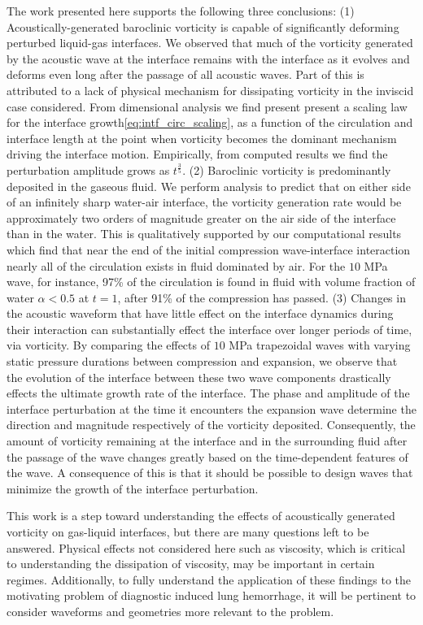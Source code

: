 \documentclass{article}
\begin{document}
The work presented here supports the following three conclusions: (1)
Acoustically-generated baroclinic vorticity is capable of
significantly deforming perturbed liquid-gas interfaces. We observed
that much of the vorticity generated by the acoustic wave at the
interface remains with the interface as it evolves and deforms even
long after the passage of all acoustic waves. Part of this is
attributed to a lack of physical mechanism for dissipating vorticity
in the inviscid case considered. From dimensional analysis we find
present present a scaling law for the interface
growth\eqref{eq:intf_circ_scaling}, as a function of the circulation
and interface length at the point when vorticity becomes the dominant
mechanism driving the interface motion. Empirically, from computed
results we find the perturbation amplitude grows as
$t^{\frac{3}{5}}$. 
%
(2) Baroclinic vorticity is predominantly deposited in the gaseous
fluid. We perform analysis to predict that on either side of an
infinitely sharp water-air interface, the vorticity generation rate
would be approximately two orders of magnitude greater on the air side
of the interface than in the water. This is qualitatively supported by
our computational results which find that near the end of the initial
compression wave-interface interaction nearly all of the circulation
exists in fluid dominated by air. For the $10$ MPa wave, for instance,
97\% of the circulation is found in fluid with volume fraction of
water $\alpha<0.5$ at $t=1$, after 91\% of the compression has passed.
%
(3) Changes in the acoustic waveform that have little effect on the
interface dynamics during their interaction can substantially effect
the interface over longer periods of time, via vorticity. By comparing
the effects of $10$ MPa trapezoidal waves with varying static pressure
durations between compression and expansion, we observe that the
evolution of the interface between these two wave components
drastically effects the ultimate growth rate of the interface. The
phase and amplitude of the interface perturbation at the time it
encounters the expansion wave determine the direction and magnitude
respectively of the vorticity deposited. Consequently, the amount of
vorticity remaining at the interface and in the surrounding fluid
after the passage of the wave changes greatly based on the
time-dependent features of the wave. A consequence of this is that it
should be possible to design waves that minimize the growth of the
interface perturbation.

This work is a step toward understanding the effects of acoustically
generated vorticity on gas-liquid interfaces, but there are many
questions left to be answered. Physical effects not considered here
such as viscosity, which is critical to understanding the dissipation
of viscosity, may be important in certain
regimes. Additionally, to fully understand the application of these
findings to the motivating problem of diagnostic induced lung
hemorrhage, it will be pertinent to consider waveforms and geometries
more relevant to the problem.
\end{document}
